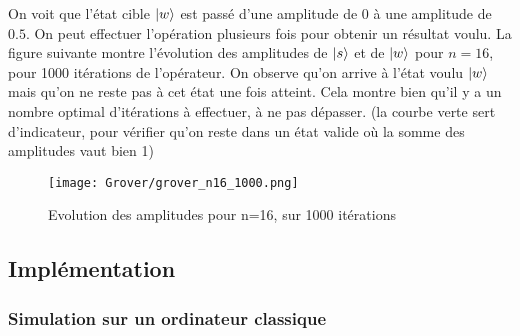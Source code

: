 On voit que l'état cible $\ket{w}$ est passé d'une amplitude de 0 à une amplitude de $0.5$. On peut effectuer l'opération plusieurs fois pour obtenir un résultat voulu. La figure suivante montre l'évolution des amplitudes de $\ket{s}$ et de $\ket{w}$ pour $n=16$, pour 1000 itérations de l'opérateur. On observe qu'on arrive à l'état voulu $\ket{w}$ mais qu'on ne reste pas à cet état une fois atteint. Cela montre bien qu'il y a un nombre optimal d'itérations à effectuer, à ne pas dépasser. (la courbe verte sert d'indicateur, pour vérifier qu'on reste dans un état valide où la somme des amplitudes vaut bien 1)

\begin{figure}[htbp]
  \centering
  \texttt{[image: Grover/grover\_n16\_1000.png]}
  \caption{Evolution des amplitudes pour n=16, sur 1000 itérations}
  \label{fig:univerise}
\end{figure}

\subsection{Implémentation}

\subsubsection*{Simulation sur un ordinateur classique}



\begin{algorithm}[H]
  \SetAlgoLined


\end{algorithm}

